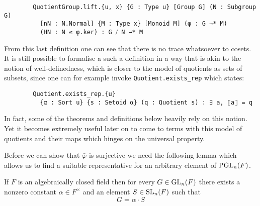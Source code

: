 \begin{remark}
    \begin{footnotesize}
    \begin{verbatim}
        QuotientGroup.lift.{u, x} {G : Type u} [Group G] (N : Subgroup G) 
          [nN : N.Normal] {M : Type x} [Monoid M] (φ : G →* M)
          (HN : N ≤ φ.ker) : G ⧸ N →* M
    \end{verbatim}
    \end{footnotesize}

    From this last definition one can see that there is no trace whatsoever to cosets. It is still possible to formalise a such a
    definition in a way that is akin to the notion of well-definedness, which is closer to the model of quotients as sets of subsets,
    since one can for example invoke \texttt{Quotient.exists_rep} which states:

    \begin{footnotesize}
    \begin{verbatim}
        Quotient.exists_rep.{u} 
          {α : Sort u} {s : Setoid α} (q : Quotient s) : ∃ a, ⟦a⟧ = q
    \end{verbatim}
    \end{footnotesize}    
    
    In fact, some of the theorems and definitions below heavily rely on this notion.
    Yet it becomes extremely useful later on to come to terms with this model of quotients and their maps which
    hinges on the universal property.
    \end{remark}

Before we can show that $\bar{\varphi}$ is surjective we need the following
lemma which allows us to find a suitable representative for an arbitrary element of $\operatorname{PGL}_n(F)$.

\begin{lemma}
\label{exists_SL_eq_scaled_GL_of_IsAlgClosed}
\leanok
If $F$ is an algebraically closed field then for every $G \in \operatorname{GL}_n(F)$ there exists a nonzero constant $\alpha \in F^\times$ and an element $S \in \operatorname{SL}_n(F)$ such that 
\begin{equation*}
    G = \alpha \cdot S
\end{equation*}
\end{lemma}

